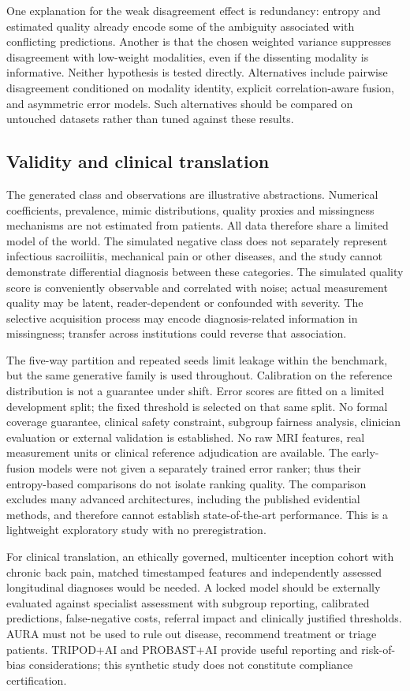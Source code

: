 \documentclass[conference]{IEEEtran}
\begin{document}
One explanation for the weak disagreement effect is redundancy: entropy and estimated quality already encode some of the ambiguity associated with conflicting predictions. Another is that the chosen weighted variance suppresses disagreement with low-weight modalities, even if the dissenting modality is informative. Neither hypothesis is tested directly. Alternatives include pairwise disagreement conditioned on modality identity, explicit correlation-aware fusion, and asymmetric error models. Such alternatives should be compared on untouched datasets rather than tuned against these results.
\subsection{Validity and clinical translation}
The generated class and observations are illustrative abstractions. Numerical coefficients, prevalence, mimic distributions, quality proxies and missingness mechanisms are not estimated from patients. All data therefore share a limited model of the world. The simulated negative class does not separately represent infectious sacroiliitis, mechanical pain or other diseases, and the study cannot demonstrate differential diagnosis between these categories. The simulated quality score is conveniently observable and correlated with noise; actual measurement quality may be latent, reader-dependent or confounded with severity. The selective acquisition process may encode diagnosis-related information in missingness; transfer across institutions could reverse that association.

The five-way partition and repeated seeds limit leakage within the benchmark, but the same generative family is used throughout. Calibration on the reference distribution is not a guarantee under shift. Error scores are fitted on a limited development split; the fixed threshold is selected on that same split. No formal coverage guarantee, clinical safety constraint, subgroup fairness analysis, clinician evaluation or external validation is established. No raw MRI features, real measurement units or clinical reference adjudication are available. The early-fusion models were not given a separately trained error ranker; thus their entropy-based comparisons do not isolate ranking quality. The comparison excludes many advanced architectures, including the published evidential methods, and therefore cannot establish state-of-the-art performance. This is a lightweight exploratory study with no preregistration.

For clinical translation, an ethically governed, multicenter inception cohort with chronic back pain, matched timestamped features and independently assessed longitudinal diagnoses would be needed. A locked model should be externally evaluated against specialist assessment with subgroup reporting, calibrated predictions, false-negative costs, referral impact and clinically justified thresholds. AURA must not be used to rule out disease, recommend treatment or triage patients. TRIPOD+AI and PROBAST+AI \cite{tripod,probast} provide useful reporting and risk-of-bias considerations; this synthetic study does not constitute compliance certification.
\end{document}
